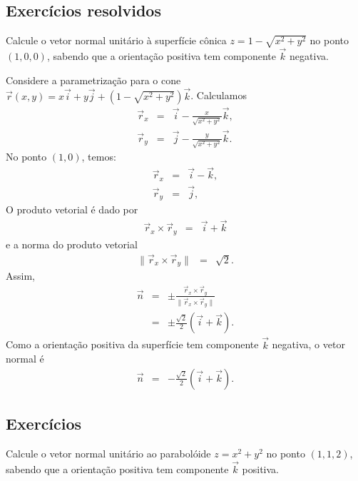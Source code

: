 \subsection*{Exercícios resolvidos}

\begin{exeresol} 
Calcule o vetor normal unitário à superfície cônica $z=1-\sqrt{x^2+y^2}$ no ponto $(1,0,0)$, sabendo que a orientação positiva tem componente $\vec{k}$ negativa. 
\end{exeresol}
\begin{resol}
 Considere a parametrização para o cone $\vec{r}(x,y)=x\vec{i}+y\vec{j}+(1-\sqrt{x^2+y^2})\vec{k}$. Calculamos
\begin{eqnarray*}
\vec{r}_x&=&\vec{i}-\frac{x}{\sqrt{x^2+y^2}}\vec{k},\\
\vec{r}_y&=&\vec{j}-\frac{y}{\sqrt{x^2+y^2}}\vec{k}.
\end{eqnarray*}
No ponto $(1,0)$, temos:
\begin{eqnarray*}
\vec{r}_x&=&\vec{i}-\vec{k},\\
\vec{r}_y&=&\vec{j},
\end{eqnarray*}
O produto vetorial é dado por
\begin{eqnarray*}
\vec{r}_x\times \vec{r}_y&=&\vec{i}+\vec{k}
\end{eqnarray*}
e a norma do produto vetorial
\begin{eqnarray*}
\|\vec{r}_x\times \vec{r}_y\|&=&\sqrt{2}.
\end{eqnarray*}
Assim,
\begin{eqnarray*}
\vec{n}&=&\pm \frac{\vec{r}_x\times \vec{r}_y}{\|\vec{r}_x\times \vec{r}_y\|}\\
&=&\pm\frac{\sqrt{2}}{2}\left(\vec{i}+\vec{k}\right).
\end{eqnarray*}
Como a orientação positiva da superfície tem componente $\vec{k}$ negativa, o vetor normal é
\begin{eqnarray*}
\vec{n}&=&-\frac{\sqrt{2}}{2}\left(\vec{i}+\vec{k}\right).
\end{eqnarray*}
\end{resol}



\subsection*{Exercícios}
\begin{exer}
Calcule o vetor normal unitário ao parabolóide $z=x^2+y^2$ no ponto $(1,1,2)$, sabendo que a orientação positiva tem componente $\vec{k}$ positiva.  
\end{exer}
   



